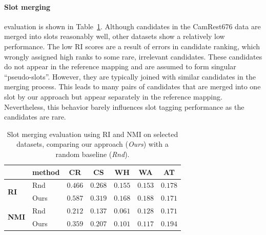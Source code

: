 \paragraph{Slot merging}\hspace{-3mm} evaluation is shown in Table~\ref{table:merging}.
Although candidates in the CamRest676 data are merged into slots reasonably well, other datasets show a relatively low performance.
The low RI scores are a result of errors in candidate ranking, which wrongly assigned high ranks to some rare, irrelevant candidates.
These candidates do not appear in the reference mapping and are assumed to form singular “pseudo-slots”.
However, they are typically joined with similar candidates in the merging process.
This leads to many pairs of candidates that are merged into one slot by our approach but appear separately in the reference mapping.
Nevertheless, this behavior barely influences slot tagging performance as the candidates are rare.
\begin{table}[h]
    \centering
    \small
    
    \begin{tabular}{ll|ccccc}
    \hline
      & \textbf{method}\hspace{-3mm} & \textbf{CR} & \textbf{CS} & \textbf{WH} & \textbf{WA} & \textbf{AT} \\
     \hline
     \multirow{2}{*}{\textbf{RI}} & Rnd & $0.466$ & $0.268$ & $0.155$ & $0.153$ & $0.178$ \\
     & Ours & $0.587$ & $0.319$ & $0.168$ & $0.188$ & $0.171$ \\\hline
     \multirow{2}{*}{\textbf{NMI}\hspace{-2mm}} & Rnd & $0.212$ & $0.137$ & $0.061$ & $0.128$ & $0.171$ \\
     & Ours & $0.359$ & $0.207$ & $0.101$ & $0.117$ & $0.194$ \\

     \hline
    \end{tabular}
    
    \caption{Slot merging evaluation using RI and NMI on selected datasets, comparing our approach (\emph{Ours}) with a random baseline (\emph{Rnd}).}
    \label{table:merging}
\end{table}

